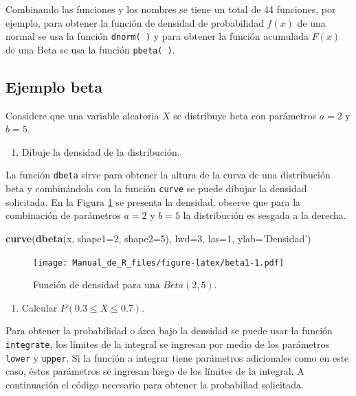 \documentclass[10pt,]{krantz}
\makeatletter
\newenvironment{Shaded}{\begin{snugshade}}{\end{snugshade}}
\newcommand{\KeywordTok}[1]{\textcolor[rgb]{0.13,0.29,0.53}{\textbf{{#1}}}}
\newcommand{\DataTypeTok}[1]{\textcolor[rgb]{0.13,0.29,0.53}{{#1}}}
\newcommand{\DecValTok}[1]{\textcolor[rgb]{0.00,0.00,0.81}{{#1}}}
\newcommand{\StringTok}[1]{\textcolor[rgb]{0.31,0.60,0.02}{{#1}}}
\newcommand{\NormalTok}[1]{{#1}}
\providecommand{\tightlist}{%
  \setlength{\itemsep}{0pt}\setlength{\parskip}{0pt}}
\newenvironment{kframe}{%
\medskip{}
\setlength{\fboxsep}{.8em}
 \def\at@end@of@kframe{}%
 \ifinner\ifhmode%
  \def\at@end@of@kframe{\end{minipage}}%
  \begin{minipage}{\columnwidth}%
 \fi\fi%
 \def\FrameCommand##1{\hskip\@totalleftmargin \hskip-\fboxsep
 \colorbox{shadecolor}{##1}\hskip-\fboxsep
     \hskip-\linewidth \hskip-\@totalleftmargin \hskip\columnwidth}%
 \MakeFramed {\advance\hsize-\width
   \@totalleftmargin\z@ \linewidth\hsize
   \@setminipage}}%
 {\par\unskip\endMakeFramed%
 \at@end@of@kframe}
\renewenvironment{Shaded}{\begin{kframe}}{\end{kframe}}
\makeatother
\begin{document}
Combinando las funciones y los nombres se tiene un total de 44
funciones, por ejemplo, para obtener la función de densidad de
probabilidad \(f(x)\) de una normal se usa la función \texttt{dnorm(\ )}
y para obtener la función acumulada \(F(x)\) de una Beta se usa la
función \texttt{pbeta(\ )}.

\subsection*{Ejemplo beta}\label{ejemplo-beta}


Considere que una variable aleatoria \(X\) se distribuye beta con
parámetros \(a=2\) y \(b=5\).

\begin{enumerate}
\def\labelenumi{\arabic{enumi})}
\tightlist
\item
  Dibuje la densidad de la distribución.
\end{enumerate}

La función \texttt{dbeta} sirve para obtener la altura de la curva de
una distribución beta y combinándola con la función \texttt{curve} se
puede dibujar la densidad solicitada. En la Figura \ref{fig:beta1} se
presenta la densidad, observe que para la combinación de parámetros
\(a=2\) y \(b=5\) la distribución es sesgada a la derecha.

\begin{Shaded}
\begin{Highlighting}[]
\KeywordTok{curve}\NormalTok{(}\KeywordTok{dbeta}\NormalTok{(x, }\DataTypeTok{shape1=}\DecValTok{2}\NormalTok{, }\DataTypeTok{shape2=}\DecValTok{5}\NormalTok{), }\DataTypeTok{lwd=}\DecValTok{3}\NormalTok{, }\DataTypeTok{las=}\DecValTok{1}\NormalTok{,}
      \DataTypeTok{ylab=}\StringTok{'Densidad'}\NormalTok{)}
\end{Highlighting}
\end{Shaded}

\begin{figure}[htbp]
\centering
\texttt{[image: Manual\_de\_R\_files/figure-latex/beta1-1.pdf]}
\caption{\label{fig:beta1}Función de densidad para una \(Beta(2, 5)\).}
\end{figure}

\begin{enumerate}
\def\labelenumi{\arabic{enumi})}
\setcounter{enumi}{1}
\tightlist
\item
  Calcular \(P(0.3 \leq X \leq 0.7)\).
\end{enumerate}

Para obtener la probabilidad o área bajo la densidad se puede usar la
función \texttt{integrate}, los límites de la integral se ingresan por
medio de los parámetros \texttt{lower} y \texttt{upper}. Si la función a
integrar tiene parámetros adicionales como en este caso, éstos
parámetros se ingresan luego de los límites de la integral. A
continuación el código necesario para obtener la probabiliad solicitada.
\end{document}
